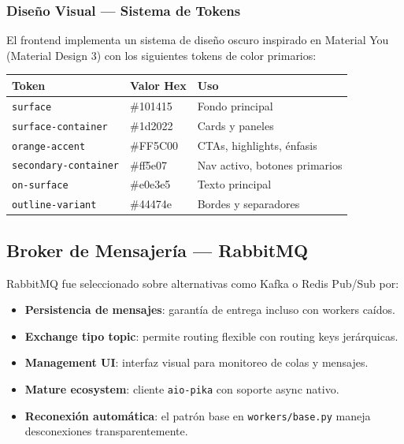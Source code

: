 \documentclass[12pt,a4paper]{article}
\newcommand{\code}[1]{\texttt{\small\color{navy}#1}}
\begin{document}
\subsubsection{Diseño Visual — Sistema de Tokens}

El frontend implementa un sistema de diseño oscuro inspirado en Material You (Material Design 3)
con los siguientes tokens de color primarios:

\begin{center}
\begin{tabular}{@{}lll@{}}
  \toprule
  \textbf{Token} & \textbf{Valor Hex} & \textbf{Uso} \\
  \midrule
  \code{surface}             & \#101415 & Fondo principal \\
  \code{surface-container}   & \#1d2022 & Cards y paneles \\
  \code{orange-accent}       & \#FF5C00 & CTAs, highlights, énfasis \\
  \code{secondary-container} & \#ff5e07 & Nav activo, botones primarios \\
  \code{on-surface}          & \#e0e3e5 & Texto principal \\
  \code{outline-variant}     & \#44474e & Bordes y separadores \\
  \bottomrule
\end{tabular}
\end{center}

\subsection{Broker de Mensajería — RabbitMQ}

RabbitMQ fue seleccionado sobre alternativas como Kafka o Redis Pub/Sub por:

\begin{itemize}
  \item \textbf{Persistencia de mensajes}: garantía de entrega incluso con workers caídos.
  \item \textbf{Exchange tipo topic}: permite routing flexible con routing keys jerárquicas.
  \item \textbf{Management UI}: interfaz visual para monitoreo de colas y mensajes.
  \item \textbf{Mature ecosystem}: cliente \code{aio-pika} con soporte async nativo.
  \item \textbf{Reconexión automática}: el patrón base en \code{workers/base.py} maneja
        desconexiones transparentemente.
\end{itemize}
\end{document}
